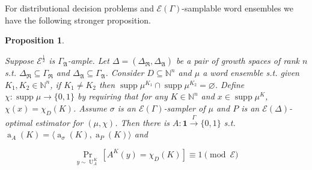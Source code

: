\documentclass{article}
\numberwithin{equation}{section}
\theoremstyle{definition}
\theoremstyle{plain}
\newtheorem{proposition}{Proposition}[section]
\newcommand{\Bool}{\{0,1\}}
\DeclareMathOperator{\Supp}{supp}
\DeclareMathOperator{\Prb}{Pr}
\DeclareMathOperator{\A}{a}
\DeclareMathOperator{\Un}{U}
\newcommand{\Nats}{\mathbb{N}}
\newcommand{\Chev}[1]{\langle #1 \rangle}
\newcommand{\GrowR}{\Gamma_{\mathfrak{R}}}
\newcommand{\GrowA}{\Gamma_{\mathfrak{A}}}
\newcommand{\Fall}{\mathcal{E}}
\newcommand{\EG}{\Fall(\Gamma)}
\newcommand{\Scheme}{\xrightarrow{\Gamma}}
\begin{document}
For distributional decision problems and ${\EG}$-samplable word ensembles we have the following stronger proposition.

\begin{samepage}
\begin{proposition}
\label{prp:tally_smp_bpp}

Suppose ${\Fall^{\frac{1}{2}}}$ is ${\GrowA}$-ample. Let ${\Delta=(\Delta_{\mathfrak{R}}, \Delta_{\mathfrak{A}})}$ be a pair of growth spaces of rank ${n}$ s.t. ${\Delta_{\mathfrak{R}} \subseteq \GrowR}$ and ${\Delta_{\mathfrak{A}} \subseteq \GrowA}$. Consider ${D \subseteq \Nats^n}$ and ${\mu}$ a word ensemble s.t. given ${K_1, K_2 \in \Nats^n}$, if ${K_1 \ne K_2}$ then ${\Supp \mu^{K_1} \cap \Supp \mu^{K_2} = \varnothing}$. Define ${\chi: \Supp \mu \rightarrow \Bool}$ by requiring that for any ${K \in \Nats^n}$ and $x \in \Supp \mu^K$, ${\chi(x)=\chi_D(K)}$. Assume ${\sigma}$ is an ${\EG}$-sampler of ${\mu}$ and ${P}$ is an ${\Fall(\Delta)}$-optimal estimator for ${(\mu, \chi)}$. Then there is ${A: \bm{1} \Scheme \Bool}$ s.t. ${\A_A(K)=\Chev{\A_\sigma(K),\A_P(K)}}$ and

\begin{equation}
\Prb_{y \sim \Un_A^K}[A^K(y)=\chi_D(K)] \equiv 1 \pmod \Fall
\end{equation}

\end{proposition}
\end{samepage}
\end{document}
